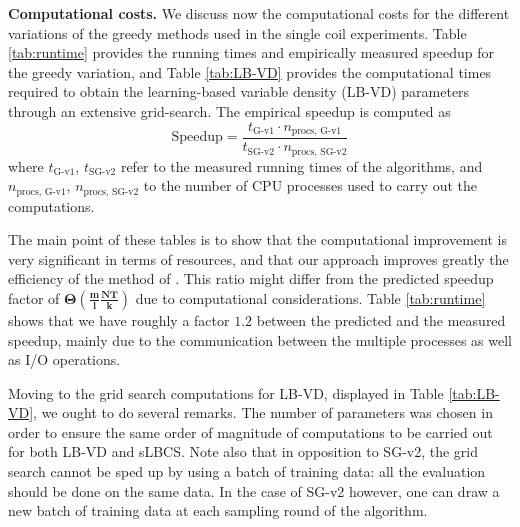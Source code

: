 \textbf{Computational costs.} We discuss now the computational costs for the different variations of the greedy methods used in the single coil experiments. Table \ref{tab:runtime}  provides the running times and empirically measured speedup for the greedy variation, and Table \ref{tab:LB-VD} provides the computational times required to obtain the learning-based variable density (LB-VD) parameters through an extensive grid-search. The empirical speedup is computed as 
\begin{equation}
\text{Speedup} = \frac{t_{\text{G-v1}}\cdot n_{\text{procs, G-v1}}}{t_{\text{SG-v2}}\cdot n_{\text{procs, SG-v2}}}
\end{equation}
where $t_{\text{G-v1}}$, $t_{\text{SG-v2}}$ refer to the measured running times of the algorithms, and $n_{\text{procs, G-v1}}$, $n_{\text{procs, SG-v2}}$ to the number of CPU processes used to carry out the computations. 

The main point of these tables is to show that the computational improvement is very significant in terms of resources, and that our approach improves greatly the efficiency of the method of \citet{gozcu2018learning}. This ratio might differ from the predicted speedup factor of $\mathbf{\Theta\left(\frac{m}{l}\frac{NT}{k}\right)}$ due to computational considerations. Table \ref{tab:runtime} shows that we have roughly a factor $1.2$ between the predicted and the measured speedup, mainly due to the communication between the multiple processes as well as I/O operations.

Moving to the grid search computations for LB-VD, displayed in Table \ref{tab:LB-VD}, we ought to do several remarks. The number of parameters was chosen in order to ensure the same order of magnitude of computations to be carried out for both LB-VD and sLBCS. Note also that in opposition to SG-v2, the grid search cannot be sped up by using a batch of training data: all the evaluation should be done on the same data. In the case of SG-v2 however, one can draw a new batch of training data at each sampling round of the algorithm.

